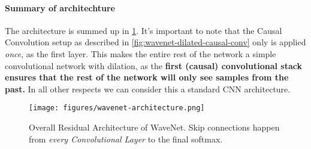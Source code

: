 \paragraph{Summary of architechture}
The architecture is summed up in \cref{fig:wavenet-architecture}.
It's important to note that the Causal Convolution setup as described in \cref{fig:wavenet-dilated-causal-conv} only is applied \textit{once}, as the first layer.
This makes the entire rest of the network a simple convolutional network with dilation, as the \textbf{first (causal) convolutional stack ensures that the rest of the network will only see samples from the past.}
In all other respects we can consider this a standard CNN architecture. 


\begin{figure}
    \begin{small}
        \begin{center}
            \texttt{[image: figures/wavenet-architecture.png]}
        \end{center}
        \caption{Overall Residual Architecture of WaveNet. 
        Skip connections happen from \textit{every Convolutional Layer} to the final softmax.}
        \label{fig:wavenet-architecture}
    \end{small}
\end{figure}

